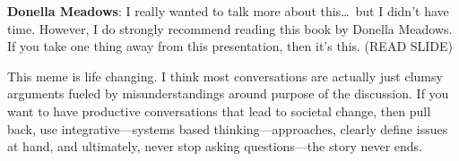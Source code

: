 \documentclass[basic]{inVerba-notes}
\begin{document}
    \textbf{Donella Meadows}: I really wanted to talk more about this\dots\ but I didn't have time. However, I do strongly recommend reading this book by Donella Meadows. If you take one thing away from this presentation, then it's this. (READ SLIDE)
    
    This meme is life changing. I think most conversations are actually just clumsy arguments fueled by misunderstandings around purpose of the discussion. If you want to have productive conversations that lead to societal change, then pull back, use integrative---systems based thinking---approaches, clearly define issues at hand, and ultimately, never stop asking questions---the story never ends.
    

\nocite*{}


\end{document}
